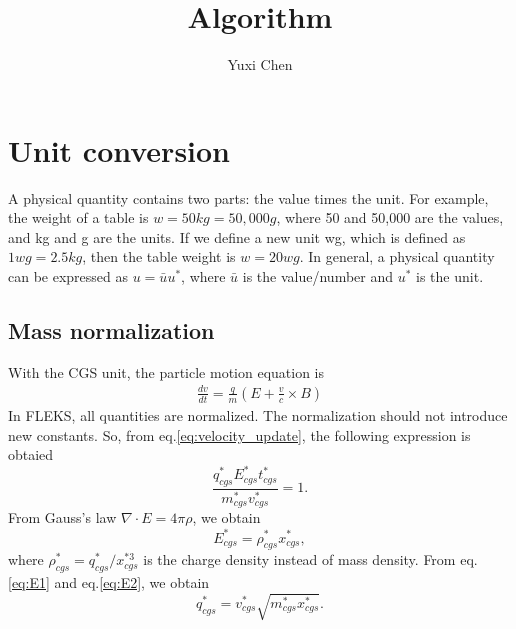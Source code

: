 \documentclass[a4paper, 11pt]{article}
\author{Yuxi Chen}
\title{Algorithm}
\begin{document}
\maketitle
\newpage

\section{Unit conversion}

A physical quantity contains two parts: the value times the unit. For example, the weight of a table is $w = 50 kg = 50,000 g$, where 50 and 50,000 are the values, and kg and g are the units. If we define a new unit wg, which is defined as $1 wg = 2.5 kg$, then the table weight is $w = 20 wg$. In general, a physical quantity can be expressed as $u = \bar{u} u^*$, where $\bar{u}$ is the value/number and $u^*$ is the unit.  

\subsection{Mass normalization}
\label{sec:mass_norm}

With the CGS unit, the particle motion equation is
\begin{eqnarray}
\frac{dv}{dt} = \frac{q}{m}(E + \frac{v}{c} \times B) 
\label{eq:velocity_update}
\end{eqnarray}
In FLEKS, all quantities are normalized. The normalization should not introduce new constants. So, from eq.\ref{eq:velocity_update}, the following expression is obtaied
\begin{equation}
\frac{q_{cgs}^* E_{cgs}^* t_{cgs}^*}{m_{cgs}^* v_{cgs}^*} = 1.
\label{eq:E1}
\end{equation}
From Gauss's law $\nabla\cdot E = 4\pi \rho$, we obtain 
\begin{equation}
E_{cgs}^* = \rho_{cgs} ^*x_{cgs}^*,
\label{eq:E2}
\end{equation}
where $\rho_{cgs}^* = q_{cgs}^*/x_{cgs}^{*3}$ is the charge density instead of mass density. From eq.\ref{eq:E1} and eq.\ref{eq:E2}, we obtain 
\begin{equation}
q_{cgs}^*=v_{cgs}^* \sqrt{m_{cgs}^* x_{cgs}^*}.
\label{eq:q1}
\end{equation}
\end{document}
